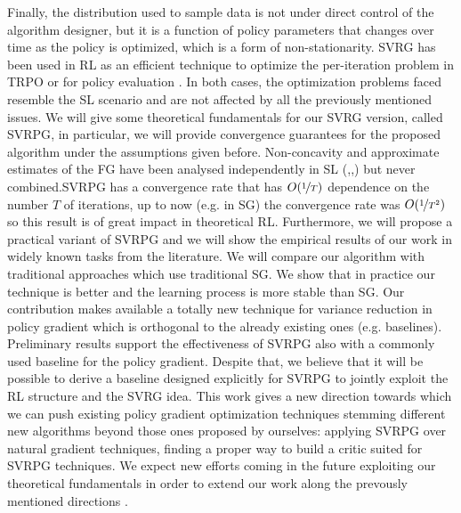 Finally, the distribution used to sample data is not under direct control of the algorithm designer, but it is a function of policy parameters that changes over time as the policy is optimized, which is a form of non-stationarity. 
\acs{SVRG} has been used in \acs{RL} as an efficient technique to optimize the per-iteration problem in \ac{TRPO} \citep{xu2017stochastic} or for policy evaluation \citep{du2017stochastic}. In both cases, the optimization problems faced resemble the \acs{SL} scenario and are not affected by all the previously mentioned issues.
We will give some theoretical fundamentals for our \acs{SVRG} version, called \acs{SVRPG}, in particular, we will provide convergence guarantees for the proposed algorithm under the assumptions given before. Non-concavity and approximate estimates of the FG have been analysed independently in SL (\cite{allen2016variance},\cite{reddi2016stochastic},\cite{harikandeh2015stopwasting}) but never combined.\newline SVRPG has a convergence rate that has $O(\nicefrac{1}{T})$ dependence on the number $T$ of iterations, up to now (e.g. in \acs{SG}) the convergence rate was  $O(\nicefrac{1}{T^2})$ so this result is of great impact in theoretical \acs{RL}.\newline
 Furthermore, we will propose a practical variant of \acs{SVRPG} and we will show the empirical results of our work in widely known tasks from the literature. We will compare our algorithm with traditional approaches which use traditional \acs{SG}. We show that in practice our technique is better and the learning process is more stable than \acs{SG}.\newline
Our contribution makes available a totally new technique for variance reduction in policy gradient which is orthogonal to the already existing ones (e.g. baselines).
Preliminary results support the effectiveness of SVRPG also with a commonly used baseline for the policy gradient. Despite that, we believe that it will be possible to derive a baseline designed explicitly for SVRPG to jointly exploit the RL structure and the SVRG idea.\newline
This work gives a new direction towards which we can push existing policy gradient optimization techniques stemming different new algorithms beyond those ones proposed by ourselves: applying \acs{SVRPG} over natural gradient techniques, finding a proper way to build a critic suited for \acs{SVRPG} techniques. We expect new efforts coming in the future exploiting our theoretical fundamentals in order to extend our work along the prevously mentioned directions .\newline
